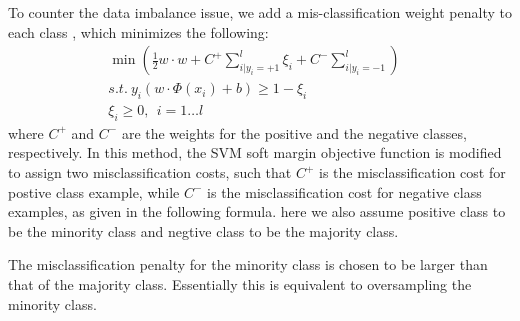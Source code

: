 To counter the data imbalance issue, we add a mis-classification weight penalty
to each class \cite{osuna1997support}, which minimizes the following:
\begin{align}
\min \left(\frac{1}{2} w \cdot w + C^+ \sum^l_{i | y_i=+1}\xi_i 
	+ C^- \sum^l_{i | y_i=-1}\right) & \nonumber\\
s.t.~ y_i(w \cdot \Phi(x_i) + b) \ge 1-\xi_i &\\
\xi_i \ge 0,~~  i=1\ldots l \nonumber&
\end{align}
where $C^{+}$ and $C^{-}$ are the weights for the positive and
the negative classes, respectively. 
In this method, the SVM soft margin objective function
is modified to assign two misclassification costs, such that $C^+$ is the misclassification
cost for postive class example, while $C^-$ is the misclassification cost for negative class examples,
as given in the following formula. here we also assume positive class to be the minority class and
negtive class to be the majority class.

The misclassification penalty for the minority class is chosen to be larger than that of the majority class.
Essentially this is equivalent to oversampling the minority class. 

